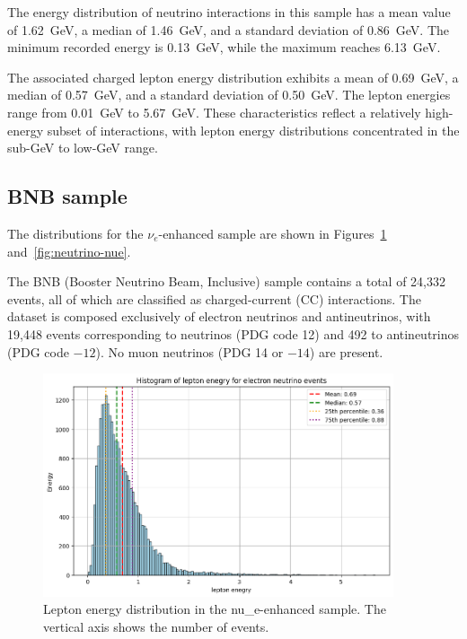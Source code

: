 \documentclass{pracalicmgr}
\begin{document}
The energy distribution of neutrino interactions in this sample has a mean value of 1.62~GeV, a median of 1.46~GeV, and a standard deviation of 0.86~GeV. The minimum recorded energy is 0.13~GeV, while the maximum reaches 6.13~GeV.

The associated charged lepton energy distribution exhibits a mean of 0.69~GeV, a median of 0.57~GeV, and a standard deviation of 0.50~GeV. The lepton energies range from 0.01~GeV to 5.67~GeV. These characteristics reflect a relatively high-energy subset of interactions, with lepton energy distributions concentrated in the sub-GeV to low-GeV range.

\subsection{BNB sample}

The distributions for the $\nu_e$-enhanced sample are shown in Figures~\ref{fig:lepton-nue} and~\ref{fig:neutrino-nue}.

The BNB (Booster Neutrino Beam, Inclusive) sample contains a total of 24,332 events, all of which are classified as charged-current (CC) interactions. The dataset is composed exclusively of electron neutrinos and antineutrinos, with 19,448 events corresponding to neutrinos (PDG code 12) and 492 to antineutrinos (PDG code $-12$). No muon neutrinos (PDG 14 or $-14$) are present.

\begin{figure}[H]
    \centering
    \includegraphics[width=0.92\textwidth]{src/leptonElectron.png}
    \caption{Lepton energy distribution in the nu\_e-enhanced sample. The vertical axis shows the number of events.}
    \label{fig:lepton-nue}
\end{figure}
\end{document}
